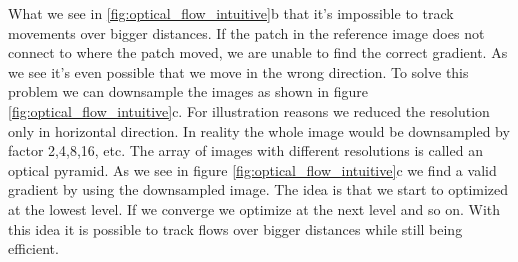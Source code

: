 \documentclass[11pt,a4paper,titlepage,oneside]{report}
\begin{document}
What we see in \ref{fig:optical_flow_intuitive}b that it's impossible to track movements over bigger distances. If the patch in the reference image does not connect to where the patch moved, we are unable to find the correct gradient. As we see it's even possible that we move in the wrong direction. To solve this problem we can downsample the images as shown in figure \ref{fig:optical_flow_intuitive}c. For illustration reasons we reduced the resolution only in horizontal direction. In reality the whole image would be downsampled by factor 2,4,8,16, etc. The array of images with different resolutions is called an optical pyramid. As we see in figure \ref{fig:optical_flow_intuitive}c we find a valid gradient by using the downsampled image. The idea is that we start to optimized at the lowest level. If we converge we optimize at the next level and so on. With this idea it is possible to track flows over bigger distances while still being efficient.
\end{document}
